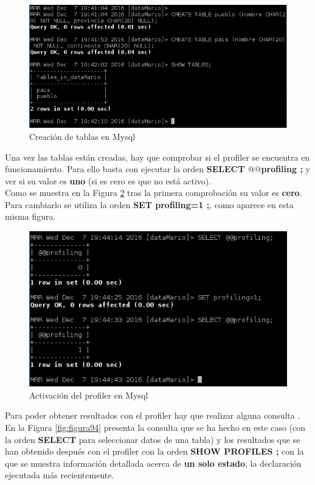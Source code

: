 \begin{figure}[H]
	\centering
	\includegraphics[scale=0.9]{figuras/ejercicio9/figura2.png} 
	\caption{Creación de tablas en Mysql} 
	\label{fig:figura92}
\end{figure}

Una vez las tablas están creadas, hay que comprobar si el profiler se encuentra en funcionamiento. Para ello basta con ejecutar la orden \textbf{SELECT $ @ $$ @ $profiling ;} y ver si su valor es \textbf{uno} (si es cero es que no está activo).\\

Como se muestra en la Figura \ref{fig:figura93} tras la primera comprobación su valor es \textbf{cero}. Para cambiarlo se utiliza la orden \textbf{SET profiling=1 ;}, como aparece en esta misma figura.

\begin{figure}[H]
	\centering
	\includegraphics[scale=1]{figuras/ejercicio9/figura3.png} 
	\caption{Activación del profiler en Mysql} 
	\label{fig:figura93}
\end{figure}

Para poder obtener resultados con el profiler hay que realizar alguna consulta \cite{enlace11}. En la Figura \ref{fig:figura94} presenta la consulta que se ha hecho en este caso (con la orden \textbf{SELECT} para seleccionar datos de una tabla) y los resultados que se han obtenido después con el profiler con la orden \textbf{SHOW PROFILES ;} con la que se muestra información detallada acerca de \textbf{un solo estado}, la declaración ejecutada más recientemente. 

